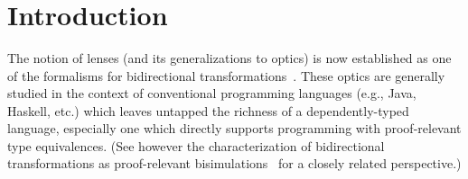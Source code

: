 \documentclass[sigplan,review,anonymous]{acmart}
\begin{document}
{\begin{code}
\AgdaSpace{}%
\AgdaSymbol{=}\AgdaSpace{}%
\AgdaSpace{}%
\AgdaSymbol{\{}\AgdaSpace{}%
\AgdaSymbol{((}\AgdaSpace{}%
\AgdaOperator{\AgdaInductiveConstructor{,}}\AgdaSpace{}%
\AgdaSymbol{)}\AgdaSpace{}%
\AgdaOperator{\AgdaInductiveConstructor{,}}\AgdaSpace{}%
\AgdaSymbol{)}\AgdaSpace{}%
\AgdaSpace{}%
\AgdaSpace{}%
\AgdaOperator{\AgdaInductiveConstructor{,}}\AgdaSpace{}%
\AgdaSpace{}%
\AgdaOperator{\AgdaInductiveConstructor{,}}\AgdaSpace{}%
\AgdaSpace{}%
\AgdaSymbol{\}}\AgdaSpace{}%
\AgdaSymbol{\}}\<%
\\
%
\>[2]\AgdaSymbol{;}\AgdaSpace{}%
\AgdaSpace{}%
\AgdaSymbol{=}\AgdaSpace{}%
%
\>[684I]\AgdaSymbol{\{}\AgdaSpace{}%
\AgdaSpace{}%
\AgdaSymbol{=}\AgdaSpace{}%
\AgdaSpace{}%
\AgdaBound{\AgdaUnderscore{}}\AgdaSpace{}%
\AgdaSpace{}%
\AgdaSymbol{(}\AgdaSpace{}%
\AgdaSymbol{)}\AgdaSpace{}%
\AgdaOperator{\AgdaInductiveConstructor{,}}\AgdaSpace{}%
\AgdaSymbol{(}\AgdaSpace{}%
\AgdaSymbol{)}\AgdaSpace{}%
\AgdaOperator{\AgdaInductiveConstructor{,}}\AgdaSpace{}%
\AgdaSymbol{(}\AgdaSpace{}%
\AgdaSymbol{)}\<%
\\
\>[.]\<[684I]%
\>[24]\AgdaSymbol{;}\AgdaSpace{}%
\AgdaSpace{}%
\AgdaSymbol{=}\AgdaSpace{}%
\AgdaSpace{}%
\AgdaBound{\AgdaUnderscore{}}\AgdaSpace{}%
\AgdaSpace{}%
\AgdaSymbol{(}\AgdaSpace{}%
\AgdaSpace{}%
\AgdaOperator{\AgdaInductiveConstructor{,}}\AgdaSpace{}%
\AgdaSpace{}%
\AgdaSymbol{)}\AgdaSpace{}%
\AgdaOperator{\AgdaInductiveConstructor{,}}\AgdaSpace{}%
\AgdaSpace{}%
\AgdaSpace{}%
\AgdaSymbol{\}}\<%
\\
%
\>[2]\AgdaSymbol{\}}\<%
\end{code}
}
\section{Introduction}

The notion of lenses (and its generalizations to optics) is now
established as one of the formalisms for bidirectional
transformations~\cite{eaab8672ebea42538109e9f72ece5ed0}. These optics
are generally studied in the context of conventional programming
languages (e.g., Java, Haskell, etc.) which leaves untapped the
richness of a dependently-typed language, especially one which
directly supports programming with proof-relevant type
equivalences. (See however the characterization of bidirectional
transformations as proof-relevant
bisimulations~\cite{eaab8672ebea42538109e9f72ece5ed0} for a closely
related perspective.)
\end{document}
